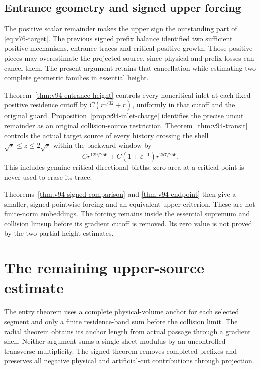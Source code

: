 \documentclass[11pt,reqno]{amsart}
\numberwithin{equation}{section}
\theoremstyle{definition}\newtheorem{definition}[theorem]{Definition}
\theoremstyle{remark}\newtheorem{remark}[theorem]{Remark}
\theoremstyle{definition}\newtheorem{inputstatement}[theorem]{Input statement}
\begin{document}


\subsection{Entrance geometry and signed upper forcing}
The positive scalar remainder makes the upper sign the outstanding
part of \eqref{eq:v76-target}. The previous signed prefix balance
identified two sufficient positive mechanisms, entrance traces and
critical positive growth. Those positive pieces may overestimate the
projected source, since physical and prefix losses can cancel them.
The present argument retains that cancellation while estimating two
complete geometric families in essential height.

Theorem~\ref{thm:v94-entrance-height} controls every noncritical inlet
at each fixed positive residence cutoff by $C(r^{1/32}+r)$, uniformly
in that cutoff and the original guard. Proposition~\ref{prop:v94-inlet-charge}
identifies the precise uncut remainder as an original collision-source
restriction. Theorem~\ref{thm:v94-transit} controls the actual target
source of every history crossing the shell $\sqrt r\le z\le2\sqrt r$
within the backward window by
\[
 C r^{129/256}+C(1+\varepsilon^{-1})r^{257/256}.
\]
This includes genuine critical directional births; zero area at a
critical point is never used to erase its trace.

Theorems~\ref{thm:v94-signed-comparison} and \ref{thm:v94-endpoint}
then give a smaller, signed pointwise forcing and an equivalent upper
criterion. These are not finite-norm embeddings. The forcing remains
inside the essential supremum and collision limsup before its gradient
cutoff is removed. Its zero value is not proved by the two partial
height estimates.






\section{The remaining upper-source estimate}
The entry theorem uses a complete physical-volume anchor for each
selected segment and only a finite residence-band sum before the
collision limit. The radial theorem obtains its anchor length from
actual passage through a gradient shell. Neither argument sums a
single-sheet modulus by an uncontrolled transverse multiplicity.
The signed theorem removes completed prefixes and preserves all
negative physical and artificial-cut contributions through projection.
\end{document}
